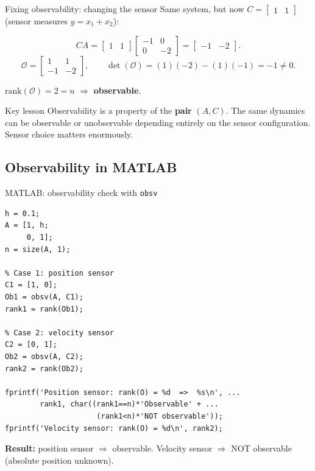 \documentclass[aspectratio=169,10pt]{beamer}
\newcommand{\Ocal}{\mathcal{O}}
\begin{document}
\begin{frame}{Fixing observability: changing the sensor}
Same system, but now $C=\begin{bmatrix}1&1\end{bmatrix}$ (sensor measures
$y=x_1+x_2$):

\[
CA=\begin{bmatrix}1&1\end{bmatrix}
\begin{bmatrix}-1&0\\0&-2\end{bmatrix}
=\begin{bmatrix}-1&-2\end{bmatrix}.
\]
\[
\Ocal=\begin{bmatrix}1&1\\-1&-2\end{bmatrix},
\qquad
\det(\Ocal)=(1)(-2)-(1)(-1)=-1\neq 0.
\]

$\mathrm{rank}(\Ocal)=2=n$ $\Rightarrow$ \textbf{observable}.

\begin{notebox}{Key lesson}
Observability is a property of the \textbf{pair} $(A,C)$.
The same dynamics can be observable or unobservable depending entirely
on the sensor configuration.  Sensor choice matters enormously.
\end{notebox}
\end{frame}

\subsection{Observability in MATLAB}

\begin{frame}[fragile]{MATLAB: observability check with \texttt{obsv}}
\begin{lstlisting}[caption={Comparing observability for two sensor configurations.}]
h = 0.1;
A = [1, h;
     0, 1];
n = size(A, 1);

% Case 1: position sensor
C1 = [1, 0];
Ob1 = obsv(A, C1);
rank1 = rank(Ob1);

% Case 2: velocity sensor
C2 = [0, 1];
Ob2 = obsv(A, C2);
rank2 = rank(Ob2);

fprintf('Position sensor: rank(O) = %d  =>  %s\n', ...
        rank1, char((rank1==n)*'Observable' + ...
                     (rank1<n)*'NOT observable'));
fprintf('Velocity sensor: rank(O) = %d\n', rank2);
\end{lstlisting}

\textbf{Result:} position sensor $\Rightarrow$ observable.
Velocity sensor $\Rightarrow$ NOT observable (absolute position unknown).
\end{frame}
\end{document}
